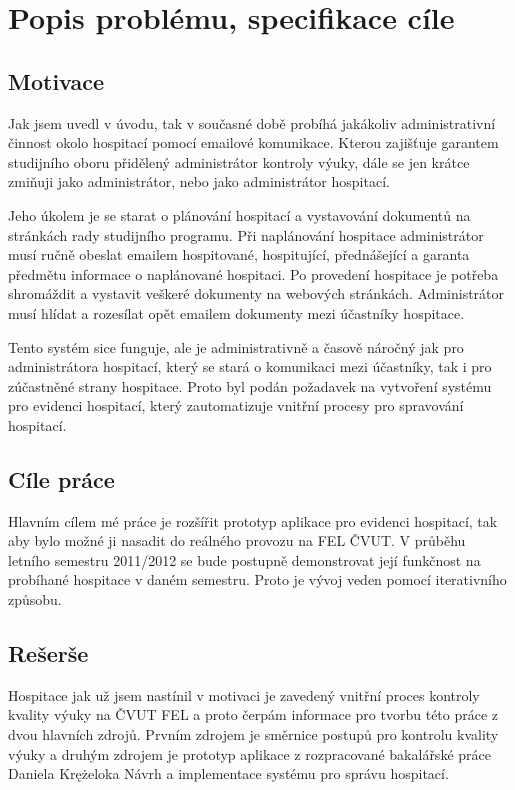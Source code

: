 \chapter{Popis problému, specifikace cíle}
\section{Motivace}
Jak jsem uvedl v úvodu, tak v současné době probíhá jakákoliv administrativní činnost okolo hospitací pomocí emailové komunikace. Kterou zajišťuje garantem studijního oboru přidělený administrátor kontroly výuky, dále se jen krátce zmiňuji jako administrátor, nebo jako administrátor hospitací. 

Jeho úkolem je se starat o plánování hospitací a vystavování dokumentů na stránkách rady studijního programu. Při naplánování hospitace administrátor musí ručně obeslat emailem hospitované, hospitující, přednášející a garanta předmětu informace o naplánované hospitaci. Po provedení hospitace je potřeba shromáždit a vystavit veškeré dokumenty na webových stránkách. Administrátor musí hlídat a rozesílat opět emailem dokumenty mezi účastníky hospitace.

Tento systém sice funguje, ale je administrativně a časově náročný jak pro administrátora hospitací, který se stará o komunikaci mezi účastníky, tak i pro zúčastněné strany hospitace. Proto byl podán požadavek na vytvoření systému pro evidenci hospitací, který zautomatizuje vnitřní procesy pro spravování hospitací.

\section{Cíle práce}
Hlavním cílem mé práce je rozšířit prototyp aplikace pro evidenci hospitací, tak aby bylo možné ji nasadit do reálného provozu na FEL ČVUT. V průběhu letního semestru 2011/2012 se bude postupně demonstrovat její funkčnost na probíhané hospitace v daném semestru. Proto je vývoj veden pomocí iterativního způsobu.

\section{Rešerše}
Hospitace jak už jsem nastínil v motivaci je zavedený vnitřní proces kontroly kvality výuky na ČVUT FEL a proto čerpám informace pro tvorbu této práce z dvou hlavních zdrojů. Prvním zdrojem je směrnice postupů pro kontrolu kvality výuky a druhým zdrojem je prototyp aplikace z rozpracované bakalářské práce Daniela Krężeloka Návrh a implementace systému pro správu hospitací.


